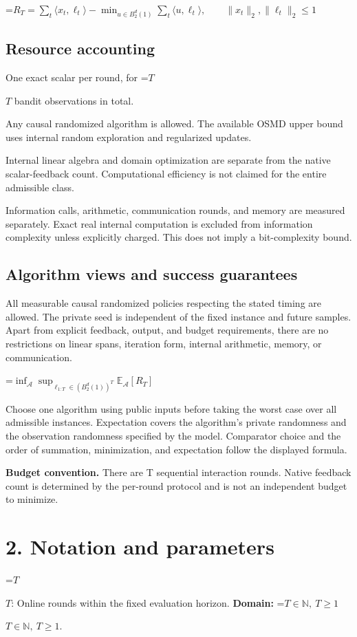 \documentclass[10pt,a4paper]{article}
\newcommand{\AtlasMath}[1]{\par\begingroup\centering\setbox0=\hbox{$\displaystyle #1$}\ifdim\wd0>1.4\linewidth\typeout{ATLAS WIDE FORMULA: \the\wd0}\fi\ifdim\wd0>\linewidth\resizebox{\linewidth}{!}{\box0}\else\box0\fi\par\endgroup}
\newcommand{\AtlasInlineMath}[1]{\begingroup\setbox0=\hbox{$#1$}\ifdim\wd0>.4\linewidth\endgroup\AtlasMath{#1}\else\endgroup$#1$\fi}
\begin{document}
\AtlasMath{R_T=\sum_t\langle x_t,\ell_t\rangle-\min_{u\in B_2^d(1)}\sum_t\langle u,\ell_t\rangle,\qquad \|x_t\|_2,\|\ell_t\|_2\le1}


\subsection{Resource accounting}
One exact scalar per round, for \AtlasInlineMath{T} bandit observations in total.

Any causal randomized algorithm is allowed. The available OSMD upper bound uses internal random exploration and regularized updates.

Internal linear algebra and domain optimization are separate from the native scalar-feedback count. Computational efficiency is not claimed for the entire admissible class.

Information calls, arithmetic, communication rounds, and memory are measured separately. Exact real internal computation is excluded from information complexity unless explicitly charged. This does not imply a bit-complexity bound.

\subsection{Algorithm views and success guarantees}
All measurable causal randomized policies respecting the stated timing are allowed. The private seed is independent of the fixed instance and future samples. Apart from explicit feedback, output, and budget requirements, there are no restrictions on linear spans, iteration form, internal arithmetic, memory, or communication.


\AtlasMath{\inf_{\mathcal{A}}\sup_{\ell_{1:T}\in(B_2^d(1))^T}\mathbb{E}_{\mathcal{A}}[R_T]}


Choose one algorithm using public inputs before taking the worst case over all admissible instances. Expectation covers the algorithm's private randomness and the observation randomness specified by the model. Comparator choice and the order of summation, minimization, and expectation follow the displayed formula.

\textbf{Budget convention.} There are T sequential interaction rounds. Native feedback count is determined by the per-round protocol and is not an independent budget to minimize.

\section{2. Notation and parameters}
\AtlasInlineMath{T}: Online rounds within the fixed evaluation horizon. \textbf{Domain:} \AtlasInlineMath{T\in\mathbb N,\ T\ge1}.
\end{document}
